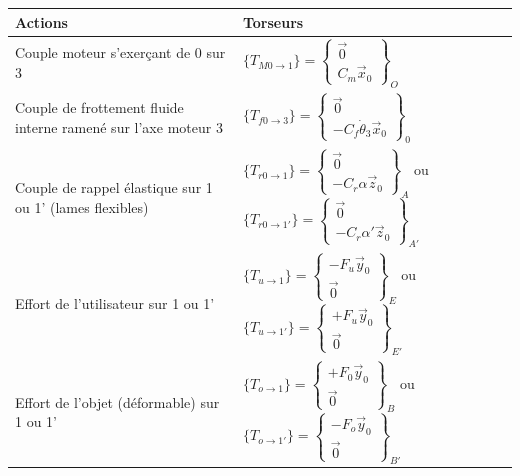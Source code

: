 \begin{center}
\begin{tabular}{|m{4cm}|m{11cm}|}
    \hline
    Actions & Torseurs \\
    \hline
    Couple moteur s'exerçant de 0 sur 3 & $\{T_{M0\rightarrow 1}\} = \left\{\begin{array}{c}
     \vec{0} \\ C_m \vec{x}_0 \end{array}\right\}_O$ \\
    \hline
    Couple de frottement fluide interne ramené sur l'axe moteur 3 & $\{T_{f0\rightarrow 3}\} = \left\{\begin{array}{c} \vec{0} \\ -C_f \dot{\theta}_3 \vec{x}_0 \end{array}\right\}_0$ \\
    \hline
    Couple de rappel élastique sur 1 ou 1' (lames flexibles) & $\{T_{r0\rightarrow 1}\} = \left\{\begin{array}{c} \vec{0} \\ -C_r \alpha \vec{z}_0 \end{array}\right\}_A$ ou $\{T_{r0\rightarrow 1'}\} = \left\{\begin{array}{c}  \vec{0} \\ -C_r \alpha' \vec{z}_0 \end{array}\right\}_{A'}$ \\
    \hline
    Effort de l'utilisateur sur 1 ou 1' & $\{T_{u\rightarrow 1}\} = \left\{\begin{array}{c} -F_u \vec{y}_0 \\ \vec{0} \end{array}\right\}_E$ ou $\{T_{u\rightarrow 1'}\} = \left\{\begin{array}{c} +F_u \vec{y}_0 \\ \vec{0} \end{array}\right\}_{E'}$ \\
    \hline
    Effort de l'objet (déformable) sur 1 ou 1' & $\{T_{o\rightarrow 1}\} = \left\{\begin{array}{c} +F_0 \vec{y}_0 \\ \vec{0} \end{array}\right\}_B$ ou $\{T_{o\rightarrow 1'}\} = \left\{\begin{array}{c} -F_o \vec{y}_0 \\ \vec{0} \end{array}\right\}_{B'}$ \\
    \hline
\end{tabular}
\end{center}

